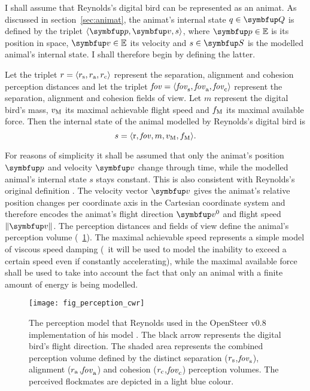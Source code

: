 I shall assume that Reynolds's digital bird can be represented as an animat. As discussed in section~\ref{sec:animat}, the animat's internal state $q \in \set{Q}$ is defined by the triplet $\langle\vect{p},\vect{v},s\rangle$, where $\vect{p} \in \E$ is its position in space, $\vect{v} \in \E$ its velocity and $s \in \set{S}$ is the modelled animal's internal state. I shall therefore begin by defining the latter. 

\begin{definition}
	\label{def:animat:s:cwr}
	Let the triplet $r=\langle r_\textnormal{s}, r_\textnormal{a}, r_\textnormal{c}\rangle$ represent the separation, alignment and cohesion perception distances and let the triplet $\mathit{fov}=\langle\mathit{fov}_\textnormal{s}, \mathit{fov}_\textnormal{a}, \mathit{fov}_\textnormal{c}\rangle$ represent the separation, alignment and cohesion fields of view. Let $m$ represent the digital bird's mass, $v_\textnormal{M}$ its maximal achievable flight speed and $f_\textnormal{M}$ its maximal available force. Then the internal state of the animal modelled by Reynolds's digital bird is 
	\begin{equation}
	s=\langle \mathrm{r}, \mathit{fov}, m, v_\textnormal{M}, f_\textnormal{M} \rangle.
	\end{equation}
\end{definition}

For reasons of simplicity it shall be assumed that only the animat's position $\vect{p}$ and velocity $\vect{v}$ change through time, while the modelled animal's internal state $s$ stays constant. This is also consistent with Reynolds's original definition \cite{reynolds:1987}. The velocity vector $\vect{v}$ gives the animat's relative position changes per coordinate axis in the Cartesian coordinate system and therefore encodes the animat's flight direction $\vect{v}^0$ and flight speed $\left\|\vect{v}\right\|$. The perception distances and fields of view define the animal's perception volume (\fig~\ref{fig:perception:cwr}). The maximal achievable speed represents a simple model of viscous speed damping (\ie\ it will be used to model the inability to exceed a certain speed even if constantly accelerating), while the maximal available force shall be used to take into account the fact that only an animal with a finite amount of energy is being modelled.

\begin{figure}
	\texttt{[image: fig\_perception\_cwr]}
	\caption{The perception model that Reynolds used in the OpenSteer v0.8 implementation of his model \cite{reynolds:1999}. The black arrow represents the digital bird's flight direction. The shaded area represents the combined perception volume defined by the distinct separation ($r_\textnormal{s}$,$\mathit{fov}_\textnormal{s}$), alignment ($r_\textnormal{a}$,$\mathit{fov}_\textnormal{a}$) and cohesion ($r_\textnormal{c}$,$\mathit{fov}_\textnormal{c}$) perception volumes. The perceived flockmates are depicted in a light blue colour.}
	\label{fig:perception:cwr}
\end{figure}

